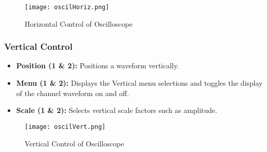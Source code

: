 \documentclass[12pt]{article}
\begin{document}
\begin{figure}[H]
    \centering
    \texttt{[image: oscilHoriz.png]}
    \caption{Horizontal Control of Oscilloscope}
\end{figure}

\subsubsection*{Vertical Control\cite{Theworki71:online}}
\begin{itemize}
    \item[] \textbf{Position (1 \& 2):} Positions a waveform vertically.
    \item[] \textbf{Menu (1 \& 2):} Displays the Vertical menu selections and toggles the display of the channel waveform on and off.
    \item[] \textbf{Scale (1 \& 2):} Selects vertical scale factors such as amplitude.
\end{itemize}

\begin{figure}[H]
    \centering
    \texttt{[image: oscilVert.png]}
    \caption{Vertical Control of Oscilloscope}
\end{figure}
\end{document}
